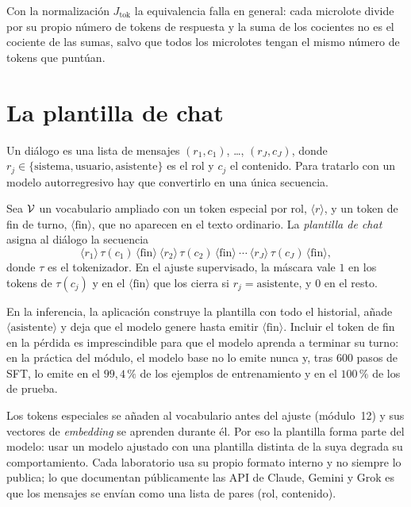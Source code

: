\begin{observacion}
Con la normalización $J_{\mathrm{tok}}$ la equivalencia falla en general: cada microlote divide por su propio número de tokens de respuesta y la suma de los cocientes no es el cociente de las sumas, salvo que todos los microlotes tengan el mismo número de tokens que puntúan.
\end{observacion}

\section{La plantilla de chat}

Un diálogo es una lista de mensajes $(r_1,c_1)$, \dots, $(r_J,c_J)$, donde $r_j\in\{\text{sistema},\text{usuario},\text{asistente}\}$ es el rol y $c_j$ el contenido. Para tratarlo con un modelo autorregresivo hay que convertirlo en una única secuencia.

\begin{definicion}\label{def:plantilla}
Sea $\mathcal{V}$ un vocabulario ampliado con un token especial por rol, $\langle r\rangle$, y un token de fin de turno, $\langle\mathrm{fin}\rangle$, que no aparecen en el texto ordinario. La \emph{plantilla de chat} asigna al diálogo la secuencia
\[
\langle r_1\rangle\,\tau(c_1)\,\langle\mathrm{fin}\rangle\ \langle r_2\rangle\,\tau(c_2)\,\langle\mathrm{fin}\rangle\ \cdots\ \langle r_J\rangle\,\tau(c_J)\,\langle\mathrm{fin}\rangle,
\]
donde $\tau$ es el tokenizador. En el ajuste supervisado, la máscara vale $1$ en los tokens de $\tau(c_j)$ y en el $\langle\mathrm{fin}\rangle$ que los cierra si $r_j=\text{asistente}$, y $0$ en el resto.
\end{definicion}

\addtocounter{figure}{1}%

En la inferencia, la aplicación construye la plantilla con todo el historial, añade $\langle\text{asistente}\rangle$ y deja que el modelo genere hasta emitir $\langle\mathrm{fin}\rangle$. Incluir el token de fin en la pérdida es imprescindible para que el modelo aprenda a terminar su turno: en la práctica del módulo, el modelo base no lo emite nunca y, tras 600 pasos de SFT, lo emite en el $99{,}4\,\%$ de los ejemplos de entrenamiento y en el $100\,\%$ de los de prueba.

\begin{observacion}
Los tokens especiales se añaden al vocabulario antes del ajuste (módulo~12) y sus vectores de \emph{embedding} se aprenden durante él. Por eso la plantilla forma parte del modelo: usar un modelo ajustado con una plantilla distinta de la suya degrada su comportamiento. Cada laboratorio usa su propio formato interno y no siempre lo publica; lo que documentan públicamente las API de Claude, Gemini y Grok es que los mensajes se envían como una lista de pares (rol, contenido).
\end{observacion}

